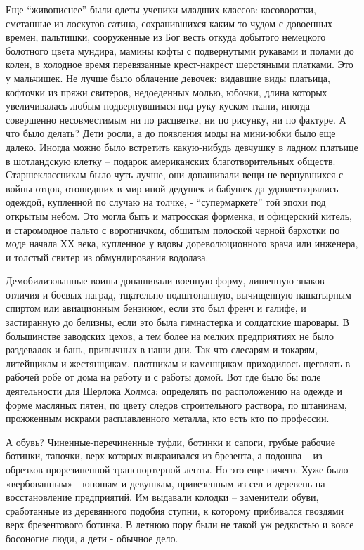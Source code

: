 Еще \enquote{живописнее} были одеты ученики младших классов: косоворотки, сметанные из
лоскутов сатина, сохранившихся каким-то чудом с довоенных времен, пальтишки,
сооруженные из Бог весть откуда добытого немецкого болотного цвета мундира,
мамины кофты с подвернутыми рукавами и полами до колен, в холодное время
перевязанные крест-накрест шерстяными платками. Это у мальчишек. Не лучше было
облачение девочек: видавшие виды платьица, кофточки из пряжи свитеров,
недоеденных молью, юбочки, длина которых увеличивалась любым подвернувшимся под
руку куском ткани, иногда совершенно несовместимым ни по расцветке, ни по
рисунку, ни по фактуре. А что было делать? Дети росли, а до появления моды на
мини-юбки было еще далеко. Иногда можно было встретить какую-нибудь девчушку в
ладном платьице в шотландскую клетку – подарок американских благотворительных
обществ. Старшеклассникам было чуть лучше, они донашивали вещи не вернувшихся с
войны отцов, отошедших в мир иной дедушек и бабушек да удовлетворялись одеждой,
купленной по случаю на толчке, - \enquote{супермаркете} той эпохи под открытым небом.
Это могла быть и матросская форменка, и офицерский китель, и старомодное пальто
с воротничком, обшитым полоской черной бархотки по моде начала ХХ века,
купленное у вдовы дореволюционного врача или инженера, и толстый свитер из
обмундирования водолаза. 

Демобилизованные воины донашивали военную форму, лишенную знаков отличия и
боевых наград, тщательно подштопанную, вычищенную нашатырным спиртом или
авиационным бензином, если это был френч и галифе, и застиранную до белизны,
если это была гимнастерка и солдатские шаровары. В большинстве заводских цехов,
а тем более на мелких предприятиях не было раздевалок и бань, привычных в наши
дни. Так что слесарям и токарям, литейщикам и жестянщикам, плотникам и
каменщикам приходилось щеголять в рабочей робе от дома на работу и с работы
домой. Вот где было бы поле деятельности для Шерлока Холмса: определять по
расположению на одежде и форме масляных пятен, по цвету следов строительного
раствора, по штанинам, прожженным искрами расплавленного металла, кто есть кто
по профессии.

А обувь? Чиненные-перечиненные туфли, ботинки и сапоги, грубые рабочие ботинки,
тапочки, верх которых выкраивался из брезента, а подошва – из обрезков
прорезиненной транспортерной ленты. Но это еще ничего. Хуже было «вербованным»
- юношам и девушкам, привезенным из сел и деревень на восстановление
предприятий. Им выдавали колодки – заменители обуви, сработанные из деревянного
подобия ступни, к которому прибивался гвоздями верх брезентового ботинка. В
летнюю пору были не такой уж редкостью и вовсе босоногие люди, а дети - обычное
дело.

